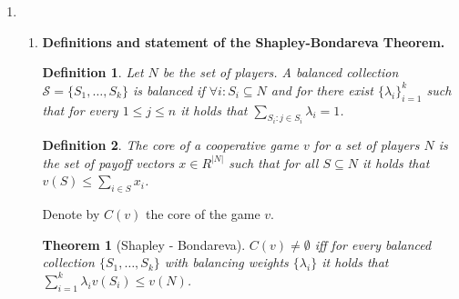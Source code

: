 \documentclass[11pt]{article} \usepackage{amssymb}
\newtheorem*{theorem*}{Theorem}
\newtheorem*{definition*}{Definition}
\begin{document}
\begin{enumerate}
\begin{enumerate}
\begin{enumerate}
      By Papademitriou's theorem the set of correlated equilibria is
      the convex hull of the Nash equilibria. Hence the set of
      achievable utilities is the triangle in $R^2$ with vertices at
      $(10,3)$, $(3,10)$ and $(30/13, 30/13)$.

    \item {\bf Prisoners' dilemma}

      The single trivial solution is $(-5,-5)$.
      
      \vspace{0.1in}
      {\bf Battle of the sexes}

      In this case each player can guarantee an expected payoff of
      $30/13$ by playing the mixed Nash strategy. Hence
      $u^*=v^*=30/13$. Since Nash bargaining is Pareto efficient the
      solution must lie on the line segment connecting $(10,3)$ and
      $(3,10)$. Since Nash Bargaining is symmetric, and since the
      feasible set is symmetric, then the solution must lie in the
      middle of the line segment, and in fact be achieved by the
      correlated equilibrium we mentioned earlier, with payoffs
      $(13/2,13/2)$.

    \end{enumerate}
  \end{enumerate}
\item
  \begin{enumerate}
  \item 
    {\bf Definitions and statement of the Shapley-Bondareva Theorem.}
    \begin{definition*}
      Let $N$ be the set of players. A {\em balanced collection}
      $\mathcal{S} = \{S_1,\ldots,S_k\}$ is balanced if $\forall i:
      S_i \subseteq N$ and for there exist $\{\lambda_i\}_{i=1}^k$
      such that for every $1 \leq j \leq n$ it holds that $\sum_{S_i:j
        \in S_i}\lambda_i=1$.
    \end{definition*}
    \begin{definition*}
      The {\em core} of a cooperative game $v$ for a set of players
      $N$ is the set of payoff vectors $x \in R^{|N|}$ such that for
      all $S \subseteq N$ it holds that $v(S) \leq \sum_{i \in S}x_i$.
    \end{definition*}
    Denote by $C(v)$ the core of the game $v$.
    \begin{theorem*}[Shapley - Bondareva]
      $C(v) \neq \emptyset$ iff for every balanced collection
      $\{S_1,\ldots,S_k\}$ with balancing weights $\{\lambda_i\}$ it
      holds that $\sum_{i=1}^k\lambda_iv(S_i) \leq v(N)$.
    \end{theorem*}


\end{enumerate}
\end{enumerate}
\end{document}
